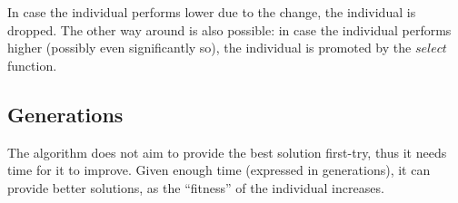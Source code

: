 \documentclass[conference]{IEEEtran}
\begin{document}
In case the individual performs lower due to the change, the individual is dropped. The other way around is also possible:
in case the individual performs higher (possibly even significantly so), the individual is promoted by the $select$ function.

\subsection{Generations}
The algorithm does not aim to provide the best solution first-try, thus it needs time for it to improve. Given enough time
(expressed in generations), it can provide better solutions, as the ``fitness'' of the individual increases.
\end{document}
